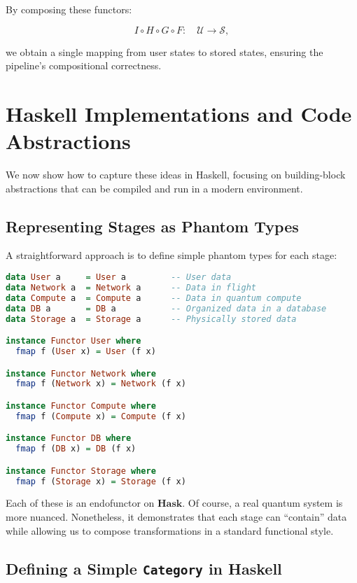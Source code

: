 \documentclass[12pt]{article}
\begin{document}
By composing these functors:

\[
I \circ H \circ G \circ F :
\quad
\mathcal{U} \longrightarrow \mathcal{S},
\]

we obtain a single mapping from user states to stored states,
ensuring the pipeline’s compositional correctness.

\section{Haskell Implementations and Code Abstractions}

We now show how to capture these ideas in Haskell, focusing
on building-block abstractions that can be compiled and run
in a modern environment.

\subsection{Representing Stages as Phantom Types}

A straightforward approach is to define simple phantom types
for each stage:

\begin{lstlisting}[language=Haskell,caption={Pipeline stage phantom types.},float]
data User a     = User a         -- User data
data Network a  = Network a      -- Data in flight
data Compute a  = Compute a      -- Data in quantum compute
data DB a       = DB a           -- Organized data in a database
data Storage a  = Storage a      -- Physically stored data

instance Functor User where
  fmap f (User x) = User (f x)

instance Functor Network where
  fmap f (Network x) = Network (f x)

instance Functor Compute where
  fmap f (Compute x) = Compute (f x)

instance Functor DB where
  fmap f (DB x) = DB (f x)

instance Functor Storage where
  fmap f (Storage x) = Storage (f x)
\end{lstlisting}

Each of these is an endofunctor on \(\mathbf{Hask}\). Of course,
a real quantum system is more nuanced. Nonetheless, it demonstrates
that each stage can “contain” data while allowing us to compose
transformations in a standard functional style.

\subsection{Defining a Simple \texttt{Category} in Haskell}
\end{document}
